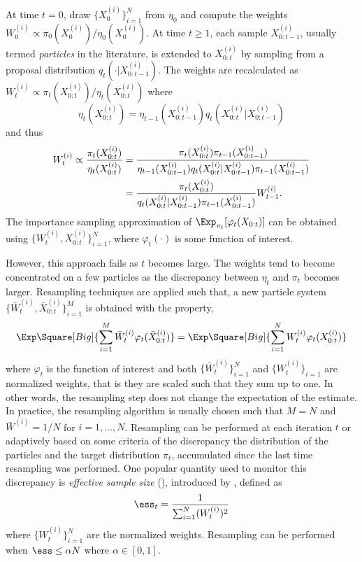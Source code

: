 At time $t = 0$, draw $\{X_0^{(i)}\}_{i=1}^N$ from $\eta_0$ and compute the
weights $W_0^{(i)} \propto \pi_0(X_0^{(i)})/\eta_0(X_0^{(i)})$. At time
$t\ge1$, each sample $X_{0:t-1}^{(i)}$, usually termed \emph{particles} in the
literature, is extended to $X_{0:t}^{(i)}$ by sampling from a proposal
distribution $q_t(\cdot|X_{0:t-1}^{(i)})$. The weights are recalculated as
$W_t^{(i)} \propto \pi_t(X_{0:t}^{(i)})/\eta_t(X_{0:t}^{(i)})$ where
\begin{equation}
  \eta_t(X_{0:t}^{(i)}) =
  \eta_{t-1}(X_{0:t-1}^{(i)})q_t(X_{0:t}^{(i)}|X_{0:t-1}^{(i)})
\end{equation}
and thus
\begin{align}
  W_t^{(i)} \propto \frac{\pi_t(X_{0:t}^{(i)})}{\eta_t(X_{0:t}^{(i)})}
  &= \frac{\pi_t(X_{0:t}^{(i)})\pi_{t-1}(X_{0:t-1}^{(i)})}
  {\eta_{t-1}(X_{0:t-1}^{(i)})q_t(X_{0:t}^{(i)}|X_{0:t-1}^{(i)})
    \pi_{t-1}(X_{0:t-1}^{(i)})} \notag\\
  &= \frac{\pi_t(X_{0:t}^{(i)})}
  {q_t(X_{0:t}^{(i)}|X_{0:t-1}^{(i)})\pi_{t-1}(X_{0:t-1}^{(i)})}W_{t-1}^{(i)}.
  \label{eq:si}
\end{align}
The importance sampling approximation of $\Exp_{\pi_t}[\varphi_t(X_{0:t})]$
can be obtained using $\{W_t^{(i)},X_{0:t}^{(i)}\}_{i=1}^N$, where
$\varphi_t(\cdot)$ is some function of interest.

However, this approach fails as $t$ becomes large. The weights tend to become
concentrated on a few particles as the discrepancy between $\eta_t$ and
$\pi_t$ becomes larger. Resampling techniques are applied such that, a new
particle system $\{\bar{W}_t^{(i)},\bar{X}_{0:t}^{(i)}\}_{i=1}^M$ is obtained
with the property,
\begin{equation}
  \Exp\Square[Big]{\sum_{i=1}^M\bar{W}_t^{(i)}\varphi_t(\bar{X}_{0:t}^{(i)})}
  = \Exp\Square[Big]{\sum_{i=1}^NW_t^{(i)}\varphi_t(X_{0:t}^{(i)})}
  \label{eq:resample}
\end{equation}
where $\varphi_t$ is the function of interest and both
$\{\bar{W}_t^{(i)}\}_{i=1}^N$ and $\{W_t^{(i)}\}_{i=1}$ are normalized
weights, that is they are scaled such that they sum up to one. In other words,
the resampling step does not change the expectation of the estimate. In
practice, the resampling algorithm is usually chosen such that $M = N$ and
$\bar{W}^{(i)} = 1/N$ for $i=1,\dots,N$. Resampling can be performed at each
iteration $t$ or adaptively based on some criteria of the discrepancy the
distribution of the particles and the target distribution $\pi_t$, accumulated
since the last time resampling was performed. One popular quantity used to
monitor this discrepancy is \emph{effective sample size} (\ess), introduced by
\cite{Liu:1998iu}, defined as
\begin{equation}
  \ess_t = \frac{1}{\sum_{i=1}^N (W_t^{(i)})^2}
\end{equation}
where $\{W_t^{(i)}\}_{i=1}^N$ are the normalized weights. Resampling can be
performed when $\ess\le \alpha N$ where $\alpha\in[0,1]$.

